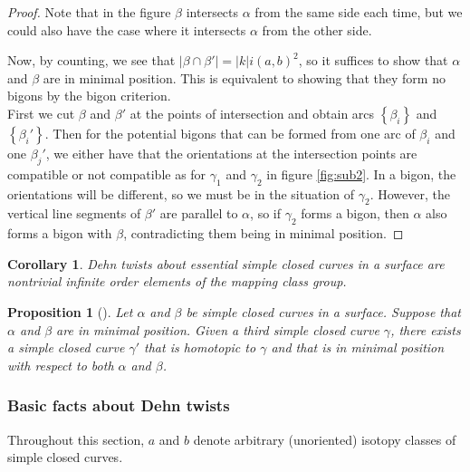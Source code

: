 \documentclass[reqno]{amsart}
\newtheorem{proposition}[theorem]{Proposition}
\newtheorem{corollary}[theorem]{Corollary}
\theoremstyle{definition}
\theoremstyle{remark}
\begin{document}
\begin{proof}
    Note that in the figure $\beta$ intersects $\alpha$ from the
    same side each time, but we could also have the
    case where it intersects $\alpha$ from the other side.

    Now, by counting, we see that
    $\left| \beta \cap \beta' \right| 
    = \left| k \right| i \left( a,b \right)^2$, so
    it suffices to show that $\alpha$ and $\beta$ are in
    minimal position. This is equivalent to showing that
    they form no bigons by the bigon criterion.\\
    
    First we cut $\beta$ and $\beta'$ at the
    points of intersection and obtain arcs
    $\left\{ \beta_i \right\} $ and
    $\left\{ \beta_i' \right\} $.
    Then for the potential bigons that can be formed
    from one arc of $\beta_i$ and one $\beta_j'$, we
    either have that the orientations at the intersection points
    are compatible or not compatible as for
    $\gamma_1$ and $\gamma_2$ in figure \ref{fig:sub2}.
    In a bigon, the orientations will be different, so
    we must be in the situation of $\gamma_2$. However, the
    vertical line segments of $\beta'$ are parallel to $\alpha$,
    so if $\gamma_2$ forms a bigon, then $\alpha$ also
    forms a bigon with $\beta$, contradicting
    them being in minimal position.
\end{proof}


\begin{corollary}
    Dehn twists about essential simple closed curves
    in a surface are nontrivial infinite order elements
    of the mapping class group.
\end{corollary}

\begin{proposition}[]
    Let $\alpha$ and $\beta$ be simple closed curves in a surface.
    Suppose that $\alpha$ and $\beta$ are in minimal position.
    Given a third simple closed curve $\gamma$, there
    exists a simple closed curve $\gamma'$ that is
    homotopic to $\gamma$ and that is in minimal position
    with respect to both $\alpha$ and $\beta$.
\end{proposition}




\subsubsection{Basic facts about Dehn twists}

Throughout this section, $a$ and $b$ denote arbitrary
(unoriented) isotopy classes of simple closed curves.
\end{document}
